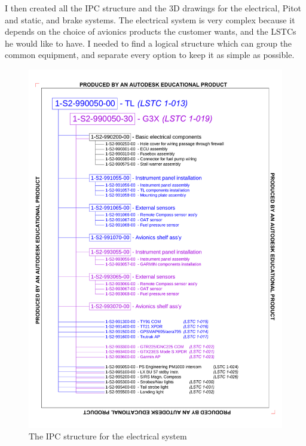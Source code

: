 \documentclass[11pt,a4paper]{article}
\begin{document}
\bigskip

I then created all the IPC structure and the 3D drawings for the electrical, Pitot and static, and brake systems.
The electrical system is very complex because it depends on the choice of avionics products the customer wants, and the LSTCs he would like to have. I needed to find a logical structure which can group the common equipment, and separate every option to keep it as simple as possible.
\begin{figure}[ht!]
	\begin{center}
		\includegraphics[width=15cm,trim = 1cm 1.5cm 1cm 1.5cm, clip]{pics/PIC015.pdf}
		\caption{The IPC structure for the electrical system}
		\label{fig:PIC015}
	\end{center}
\end{figure}
\end{document}
